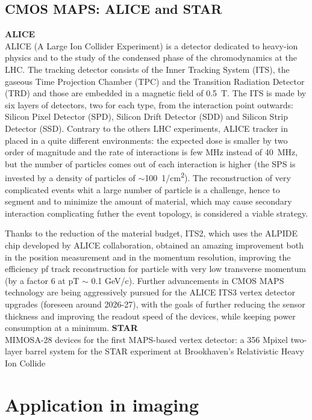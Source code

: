     \subsection{CMOS MAPS: ALICE and STAR}
        \textbf{ALICE}\\
        ALICE (A Large Ion Collider Experiment) is a detector dedicated to heavy-ion physics and to the study of the condensed phase of the chromodynamics at the LHC.
        The tracking detector consists of the Inner Tracking System (ITS), the gaseous Time Projection Chamber (TPC) and the Transition Radiation Detector (TRD) and those are embedded in a magnetic field of \SI{0.5}{T}. The ITS is made by six layers of detectors, two for each type, from the interaction point outwards: Silicon Pixel Detector (SPD), Silicon Drift Detector (SDD) and Silicon Strip Detector (SSD).         
        Contrary to the others LHC experiments, ALICE tracker in placed in a quite different environments: the expected dose is smaller by two order of magnitude and the rate of interactions is few \si{MHz} instead of \SI{40}{MHz}, but the number of particles comes out of each interaction is higher (the SPS is invested by a density of particles of $\sim$\SI{100}{1/cm\squared}).  
        The reconstruction of very complicated events whit a large number of particle is a challenge, hence to segment and to minimize the amount of material, which may cause secondary interaction complicating futher the event topology, is considered a viable strategy. 

        Thanks to the reduction of the material budget, ITS2, which uses the ALPIDE chip developed by ALICE collaboration, obtained an amazing improvement both in the position measurement and in the momentum resolution, improving the efficiency pf track reconstruction for particle with very low transverse momentum (by a factor 6 at pT $\sim$ 0.1 GeV/c). Further advancements in CMOS MAPS technology are being aggressively pursued for the ALICE ITS3 vertex detector upgrades (foreseen around 2026-27), with the goals of further reducing the sensor thickness and improving the readout speed of the devices, while keeping power consumption at a minimum.
        \vspace{5mm}
        \textbf{STAR}\\
        MIMOSA-28 devices for the first MAPS-based vertex detector: a 356 Mpixel two-layer barrel system for the STAR experiment at Brookhaven’s Relativistic Heavy Ion Collide

\section{Application in imaging}
